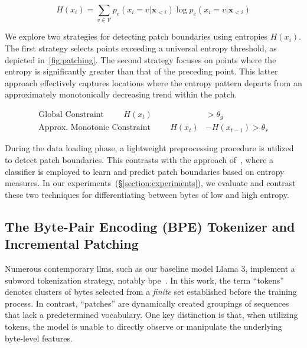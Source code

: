 \begin{equation}
H(x_i) = \sum_{v \in \mathcal{V}} p_{e}(x_i=v|\pmb{x}_{<i}) \log p_{e}(x_i=v|\pmb{x}_{<i})
\end{equation}

We explore two strategies for detecting patch boundaries using entropies $H(x_i)$. The first strategy selects points exceeding a universal entropy threshold, as depicted in~\autoref{fig:patching}. The second strategy focuses on points where the entropy is significantly greater than that of the preceding point. This latter approach effectively captures locations where the entropy pattern departs from an approximately monotonically decreasing trend within the patch.

\begin{align*}
    \text{Global Constraint}\hspace{1cm}H(x_t)& > \theta_g\\
    \text{Approx. Monotonic Constraint}\hspace{1cm}H(x_t)& - H(x_{t-1}) > \theta_r
\end{align*}

During the data loading phase, a lightweight preprocessing procedure is utilized to detect patch boundaries. This contrasts with the approach of~\citet{nawrot-etal-2023-efficient}, where a classifier is employed to learn and predict patch boundaries based on entropy measures. In our experiments~(\S\ref{section:experiments}), we evaluate and contrast these two techniques for differentiating between bytes of low and high entropy.

\subsection{The Byte-Pair Encoding (BPE) Tokenizer and Incremental Patching}
\label{section:incremental-patching}
\label{section:bpe-patch}

Numerous contemporary llms, such as our baseline model Llama 3, implement a subword tokenization strategy, notably bpe~\citep{gage1994new, sennrich-etal-2016-neural}. In this work, the term ``tokens'' denotes clusters of bytes selected from a \textit{finite} set established before the training process. In contrast, ``patches'' are dynamically created groupings of sequences that lack a predetermined vocabulary. One key distinction is that, when utilizing tokens, the model is unable to directly observe or manipulate the underlying byte-level features.

